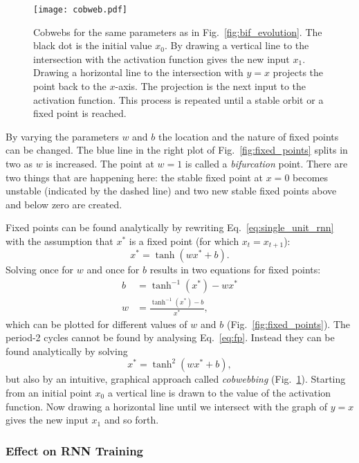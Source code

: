 \begin{figure}
  \centering
  \texttt{[image: cobweb.pdf]}
  \caption{Cobwebs for the same parameters as in Fig.~\ref{fig:bif_evolution}.
    The black dot is the initial value $x_0$. By drawing a vertical line to the
    intersection with the activation function gives the new input $x_1$. Drawing
    a horizontal line to the intersection with $y = x$ projects the point back to
    the $x$-axis.  The projection is the next input to the activation function.
    This process is repeated until a stable orbit or a fixed point is reached.}
  \label{fig:cobweb}
\end{figure}



By varying the parameters $w$ and $b$ the location and the nature of fixed
points can be changed. The blue line in the right plot of
Fig.~\ref{fig:fixed_points} splits in two as $w$ is increased. The point at
$w=1$ is called a \emph{bifurcation} point.  There are two things that are
happening here: the stable fixed point at $x=0$ becomes unstable (indicated by
the dashed line) and two new stable fixed points above and below zero are
created.

Fixed points can be found analytically by rewriting
Eq.~\ref{eq:single_unit_rnn} with the assumption that $x^*$ is a fixed point
(for which $x_t = x_{t+1}$):
\begin{equation}
  \label{eq:fp}
  x^* = \tanh(wx^* +b).
\end{equation}
Solving once for $w$ and once for $b$ results in two equations for fixed
points:
\begin{align}
  b &= \tanh^{-1}(x^*) - wx^*\\
  w &= \frac{\tanh^{-1}(x^*) - b}{x^*},
\end{align}
which can be plotted for different values of $w$ and $b$
(Fig.~\ref{fig:fixed_points}).  The period-2 cycles cannot be found by
analysing Eq.~\ref{eq:fp}.  Instead they can be found analytically by solving
\begin{equation}
  x^* = \tanh^2(wx^* + b),
\end{equation}
but also by an intuitive, graphical approach called \emph{cobwebbing}
(Fig.~\ref{fig:cobweb}).
Starting from an initial point $x_0$ a vertical line is drawn to the value of
the activation function. Now drawing a horizontal line until we intersect with
the graph of $y = x$ gives the new input $x_1$ and so forth.

\subsubsection{Effect on RNN Training}%
\label{ssub:effect_on_rnn_training}

